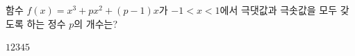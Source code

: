 함수 $f(x)=x^3+px^2+(p-1)x$가 $-1<x<1$에서 극댓값과 극솟값을 모두 갖도록 하는 정수 $p$의 개수는?
\begin{choices32}{$1$}{$2$}{$3$}{$4$}{$5$}\end{choices32}
